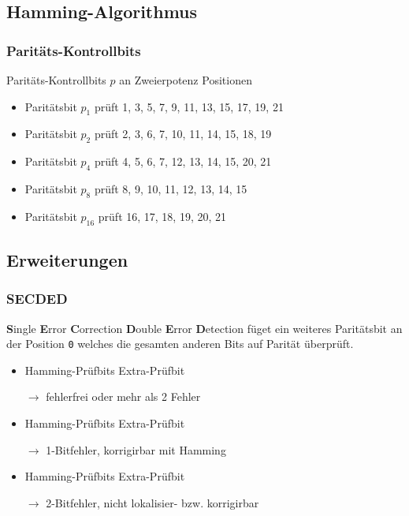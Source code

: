 \documentclass
[
	8pt,		%
	ngerman,	%
	a4paper,	%
	landscape,	%
	final		%
]{extarticle}
\begin{document}
\begin{multicols*}{4}
	\subsection{Hamming-Algorithmus}
	\subsubsection*{Paritäts-Kontrollbits}
	Paritäts-Kontrollbits $p$ an Zweierpotenz Positionen
	\begin{itemize}
		\item Paritätsbit $p_{1}$ prüft 1, 3, 5, 7, 9, 11, 13, 15, 17, 19, 21
		\item Paritätsbit $p_{2}$ prüft 2, 3, 6, 7, 10, 11, 14, 15, 18, 19
		\item Paritätsbit $p_{4}$ prüft 4, 5, 6, 7, 12, 13, 14, 15, 20, 21
		\item Paritätsbit $p_{8}$ prüft 8, 9, 10, 11, 12, 13, 14, 15
		\item Paritätsbit $p_{16}$ prüft 16, 17, 18, 19, 20, 21
	\end{itemize}
	\example
	\subsection{Erweiterungen}
	\subsubsection*{SECDED}
	\textbf{S}ingle \textbf{E}rror \textbf{C}orrection \textbf{D}ouble \textbf{E}rror
	\textbf{D}etection füget ein weiteres Paritätsbit an der Position \texttt{0} welches
	die gesamten anderen Bits auf Parität überprüft. \par
	\begin{itemize}
		\item Hamming-Prüfbits \cmark \quad Extra-Prüfbit \cmark\par
		      $\longrightarrow$ fehlerfrei oder mehr als 2 Fehler
		\item Hamming-Prüfbits \xmark \quad Extra-Prüfbit \xmark\par
		      $\longrightarrow$ 1-Bitfehler, korrigirbar mit Hamming
		\item Hamming-Prüfbits \xmark \quad Extra-Prüfbit \cmark\par
		      $\longrightarrow$ 2-Bitfehler, nicht lokalisier- bzw. korrigirbar
	\end{itemize}

	
	
	
	
	
	
	
\end{multicols*}
\end{document}
